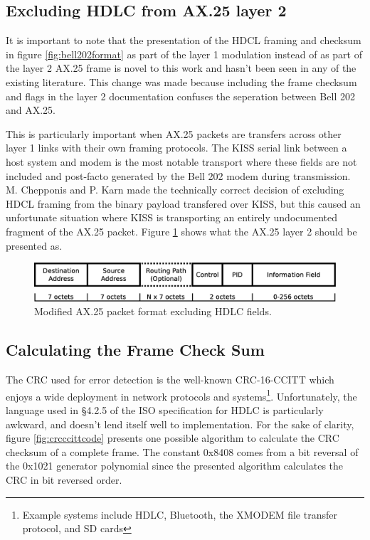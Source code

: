 \documentclass[12pt,letterpaper]{article}
\begin{document}
\begin{itemize}
\end{itemize}

\subsection{Excluding HDLC from AX.25 layer 2}

It is important to note that the presentation of the HDCL framing
and checksum
in figure \ref{fig:bell202format} as part of the layer 1 modulation 
instead of as part of the layer 2 AX.25 frame is 
novel to this work and hasn't been seen in any of the existing literature.
This change was made because including the frame checksum and flags
in the layer 2 documentation confuses the seperation between Bell 202 
and AX.25. 

This is particularly important when AX.25 packets are transfers across 
other layer 1 links with their own framing protocols.
The KISS serial link between a host system and modem is the most notable
transport where these fields are not included and post-facto generated by the
Bell 202 modem during transmission.
M. Chepponis and P. Karn made the technically correct decision of excluding 
HDCL framing from the binary payload transfered over KISS, but this caused
an unfortunate situation where KISS is transporting an entirely
undocumented fragment of the AX.25 packet. Figure \ref{fig:ax25format} 
shows what the AX.25 layer 2 should be presented as.

\begin{figure}
	\centering
	\includegraphics[width=1.0\textwidth]{src/dia/ax25}
	\caption{Modified AX.25 packet format excluding HDLC fields.}
	\label{fig:ax25format}
\end{figure}

\subsection{Calculating the Frame Check Sum}
\label{calcfcs}


The CRC used for error detection is the well-known CRC-16-CCITT which
enjoys a wide deployment in network protocols and 
systems\footnote{Example systems include HDLC, Bluetooth, the XMODEM file 
transfer protocol, and SD cards}.
Unfortunately, the language used in \S4.2.5 of the ISO specification for
HDLC \cite{iso13239} is particularly awkward, 
and doesn't lend itself well to implementation.
For the sake of clarity, figure \ref{fig:crcccittcode} 
presents one possible algorithm to
calculate the CRC checksum of a complete frame.
The constant 0x8408 comes from a bit reversal of the 0x1021 generator polynomial
since the presented algorithm calculates the CRC in bit reversed order.
\end{document}
